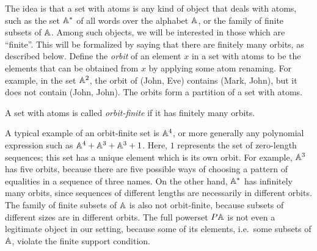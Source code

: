 The idea is that a set with atoms is any kind of object that deals with atoms, such as the set $\mathbb A^*$ of all words over the alphabet $\mathbb A$, or the family of finite subsets of $\mathbb A$. Among such objects, we will be interested in those which are ``finite''. This will be formalized by  saying that there are  finitely many orbits, as described below.
Define the \emph{orbit} of an element $x$ in a set with atoms to be the elements that can be obtained from $x$ by applying some atom renaming. For example, in the set $\mathbb A^2$,  the orbit of (John, Eve)   contains  (Mark, John), but it does not contain (John, John). The orbits form a partition of a set with atoms. 


\begin{definition}   A set with atoms is called \emph{orbit-finite} if it has finitely many orbits. 
\end{definition}

A typical example of an orbit-finite set is $\mathbb A^4$, or more generally any polynomial expression such as $\mathbb A^4 + \mathbb A^3 + \mathbb A^3 + 1$. Here, $1$ represents the set of zero-length sequences; this set has a unique element which is its own orbit.  For  example,  $\mathbb A^3$ has five orbits, because there are five possible ways of choosing a pattern of equalities in a sequence of three names. On the other hand,  $\mathbb A^*$ has infinitely many orbits, since sequences of different lengths are necessarily in different orbits.   The family of finite subsets of $\mathbb A$  is also  not orbit-finite, because subsets of different sizes are in different orbits. The full powerset $\powerset \atoms$ is not even a legitimate object in our setting, because some of its elements, i.e.~some subsets of $\mathbb A$, violate the finite support condition.

        
